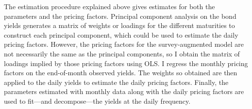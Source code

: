 {The estimation procedure explained above gives estimates for both the parameters and the pricing factors.
Principal component analysis on the bond yields generates a matrix of weights or loadings for the different maturities to construct each principal component, which could be used to estimate the daily pricing factors.
However, the pricing factors for the survey-augmented model are not necessarily the same as the principal components, so I obtain the matrix of loadings implied by those pricing factors using OLS.
I regress the monthly pricing factors on the end-of-month observed yields.
The weights so obtained are then applied to the daily yields to estimate the daily pricing factors.
Finally, the parameters estimated with monthly data along with the daily pricing factors are used to fit---and decompose---the yields at the daily frequency.

%



}{}	%


